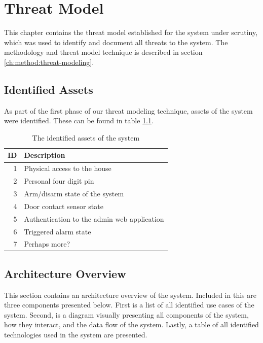 \chapter{Threat Model} \label{ch:threat-model}
This chapter contains the threat model established for the system under scrutiny, which was used to identify and document all threats to the system. The methodology and threat model technique is described in section \ref{ch:method:threat-modeling}.

\section{Identified Assets}
As part of the first phase of our threat modeling technique, assets of the system were identified. These can be found in table \ref{tb:assets}.
\begin{table}[!ht]
    \centering
    \begin{tabularx}{\textwidth}{r X}
        \hline
        \textbf{ID} & \textbf{Description}
        \\ \hline
        1  & Physical access to the house
        \\
        2  & Personal four digit pin
        \\
        3  & Arm/disarm state of the system
        \\
        4  & Door contact sensor state
        \\
        5  & Authentication to the admin web application
        \\
        6  & Triggered alarm state
        \\
        7  & Perhaps more?
        \\ \hline
    \end{tabularx}
    \caption{The identified assets of the system}
    \label{tb:assets}
\end{table}

\section{Architecture Overview}
This section contains an architecture overview of the system. Included in this are three components presented below. First is a list of all identified use cases of the system. Second, is a diagram visually presenting all components of the system, how they interact, and the data flow of the system. Lastly, a table of all identified technologies used in the system are presented.

